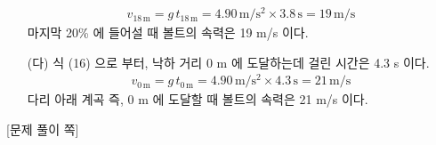 \documentclass[APS,floatfix,nofootinbib,superscriptaddress,fleqn,preprint]{revtex4}
\begin{document}
\begin{itemize}
  \begin{align}
    v_{18\,\mathrm{m}} = g\,t_{18\,\mathrm{m}} = {4.90\,\mathrm{m/s^2}}\times 3.8\,\mathrm{s} = 19\,\mathrm{m/s}
  \end{align}
  마지막 20\% 에 들어설 때 볼트의 속력은 19 m/s 이다.
  \item[(다)] 식 (16) 으로 부터, 낙하 거리 0 m 에 도달하는데 걸린 시간은 4.3 s 이다.
  \begin{align}
    v_{0\,\mathrm{m}} = g\,t_{0\,\mathrm{m}} = {4.90\,\mathrm{m/s^2}}\times 4.3\,\mathrm{s} = 21\,\mathrm{m/s} 
  \end{align}
  다리 아래 계곡 즉, 0 m 에 도달할 때 볼트의 속력은 21 m/s 이다.
\end{itemize} 
  

\newpage

{\color{gray} [문제 풀이 쪽]}

\newpage
\end{document}
